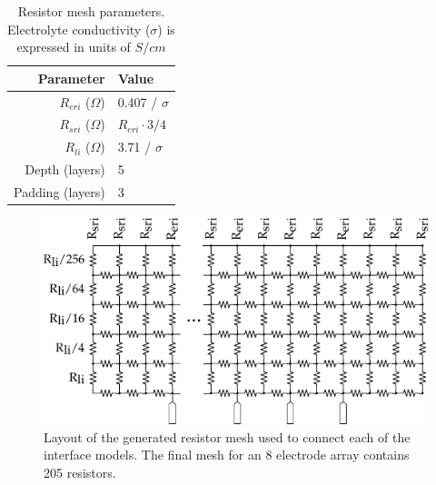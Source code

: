 \documentclass[journal, a4paper]{IEEEtran}
\begin{document}
\begin{table}
    \caption{Resistor mesh parameters. Electrolyte conductivity ($\sigma$) is expressed in units of $S / cm$}
    \label{tab:RESparams}
    \begin{center}
        \begin{tabular}{r | l}
            Parameter & Value \\
            \hline
            $R_{eri}$ ($\Omega$)& 0.407 / $\sigma$\\
            $R_{sri}$ ($\Omega$)& $R_{eri}\cdot 3/4$\\
            $R_{li}$ ($\Omega$)& 3.71 / $\sigma$ \\
            Depth (layers) & 5 \\
            Padding (layers) & 3 \\
        \end{tabular}
    \end{center}
\end{table}

\begin{figure}
    \begin{center}
        \includegraphics[width=\columnwidth]{graphics/resistorMesh_sideways}
    \end{center}
    \caption{Layout of the generated resistor mesh used to connect each of the interface models. The final mesh for an 8 electrode array contains 205 resistors.}
    \label{fig:mesh}
\end{figure}
\end{document}
